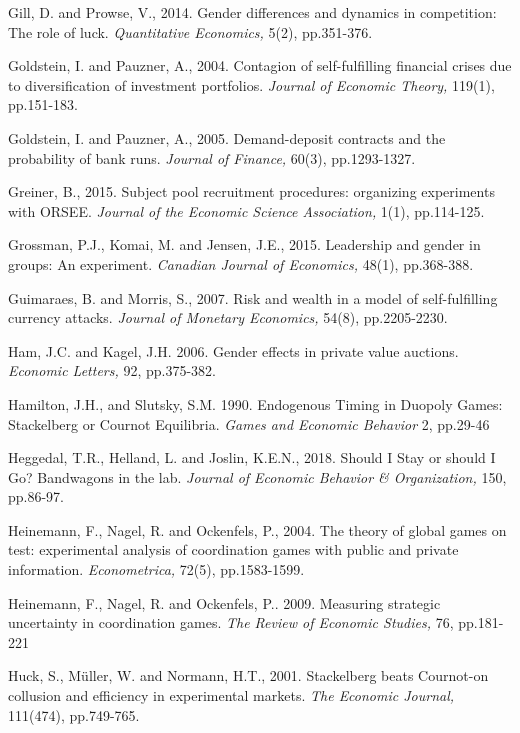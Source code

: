 \documentclass[11pt,english]{article}
\begin{document}
\begin{thebibliography}{10}
  Gill, D. and Prowse, V., 2014. Gender differences and dynamics in competition: The role of luck. \textit{Quantitative Economics,} 5(2), pp.351-376.

\bibitem{} Goldstein, I. and Pauzner, A., 2004. Contagion of self-fulfilling financial crises due to diversification of investment portfolios. \textit{Journal of Economic Theory,} 119(1), pp.151-183.

\bibitem{} Goldstein, I. and Pauzner, A., 2005. Demand-deposit contracts and the probability of bank runs. \textit{Journal of Finance,} 60(3), pp.1293-1327.

\bibitem{} Greiner, B., 2015. Subject pool recruitment procedures: organizing experiments with ORSEE. \textit{Journal of the Economic Science Association,} 1(1), pp.114-125.

\bibitem{} Grossman, P.J., Komai, M. and Jensen, J.E., 2015. Leadership and gender in groups: An experiment. \textit{Canadian Journal of Economics,} 48(1), pp.368-388.

\bibitem{}  Guimaraes, B. and Morris, S., 2007. Risk and wealth in a model of self-fulfilling currency attacks. \textit{Journal of Monetary Economics,} 54(8), pp.2205-2230.

\bibitem{}  Ham, J.C. and Kagel, J.H. 2006. Gender effects in private value auctions. \textit{Economic Letters,} 92, pp.375-382.

\bibitem{} Hamilton, J.H., and Slutsky, S.M. 1990. Endogenous Timing in Duopoly Games: Stackelberg or Cournot Equilibria. \textit{Games and Economic Behavior} 2, pp.29-46

\bibitem{} Heggedal, T.R., Helland, L. and Joslin, K.E.N., 2018. Should I Stay or should I Go? Bandwagons in the lab. \textit{Journal of Economic Behavior \& Organization,} 150, pp.86-97.

\bibitem{}Heinemann, F., Nagel, R. and Ockenfels, P., 2004. The theory of global games on test: experimental analysis of coordination games with public and private information. \textit{Econometrica, } 72(5), pp.1583-1599.

\bibitem{} Heinemann, F., Nagel, R. and Ockenfels, P.. 2009. Measuring strategic uncertainty in coordination games. \textit{The Review of Economic Studies,}  76, pp.181-221

\bibitem{}Huck, S., M\"{u}ller, W. and Normann, H.T., 2001. Stackelberg beats Cournot-on collusion and efficiency in experimental markets. \textit{The Economic Journal,} 111(474), pp.749-765.


\end{thebibliography}
\end{document}
